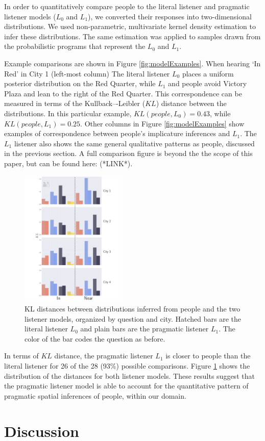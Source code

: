 \documentclass[10pt,letterpaper]{article}
\begin{document}
In order to quantitatively compare people to the literal listener and pragmatic listener models ($L_0$ and $L_1$), we converted their responses into two-dimensional distributions. We used non-parametric, multivariate kernel density estimation to infer these distributions. The same estimation was applied to samples drawn from the probabilistic programs that represent the $L_0$ and $L_1$. 

Example comparisons are shown in Figure \ref{fig:modelExamples}. When hearing `In Red' in City 1 (left-most column) The literal listener $L_0$ places a uniform posterior distribution on the Red Quarter, while $L_1$ and people avoid Victory Plaza and lean to the right of the Red Quarter. This correspondence can be measured in terms of the Kullback–-Leibler ($KL$) distance between the distributions. In this particular example, $KL(people, L_0) = 0.43$, while $KL(people, L_1) = 0.25$. Other columns in Figure \ref{fig:modelExamples} show examples of correspondence between people's implicature inferences and $L_1$. The $L_1$ listener also shows the same general qualitative patterns as people, discussed in the previous section. A full comparison figure is beyond the the scope of this paper, but can be found here: (*LINK*).

\begin{figure}[!t]
\center
\includegraphics[width=0.45\textwidth]{figures/KL.pdf}
\caption{KL distances between distributions inferred from people and the two listener models, organized by question and city. Hatched bars are the literal listener $L_0$ and plain bars are the pragmatic listener $L_1$. The color of the bar codes the question as before.}
\label{fig:KL}
\end{figure}

In terms of $KL$ distance, the pragmatic listener $L_1$ is closer to people than the literal listener for 26 of the 28 (93\%) possible comparisons. Figure \ref{fig:KL} shows the distribution of the distances for both listener models. These results suggest that the pragmatic listener model is able to account for the quantitative pattern of pragmatic spatial inferences of people, within our domain.  

\section{Discussion}






\setlength{\bibleftmargin}{.125in}
\setlength{\bibindent}{-\bibleftmargin}

\end{document}
